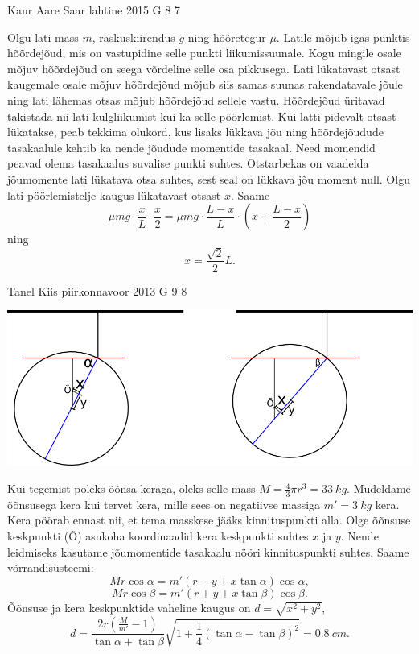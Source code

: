\documentclass[11pt]{article}
\begin{document}
{%
{Kaur Aare Saar} %
{lahtine} %
{2015} %
{G 8} %
{7} %
{

\ifSolution
Olgu lati mass $m$, raskuskiirendus $g$ ning hõõretegur $\mu$. Latile mõjub igas punktis hõõrdejõud, mis on vastupidine selle punkti liikumissuunale. Kogu mingile osale mõjuv hõõrdejõud on seega võrdeline selle osa pikkusega. Lati lükatavast otsast kaugemale osale mõjuv hõõrdejõud mõjub siis samas suunas rakendatavale jõule ning lati lähemas otsas mõjub hõõrdejõud sellele vastu. Hõõrdejõud üritavad takistada nii lati kulgliikumist kui ka selle pöörlemist. Kui latti pidevalt otsast lükatakse, peab tekkima olukord, kus lisaks lükkava jõu ning hõõrdejõudude tasakaalule kehtib ka nende jõudude momentide tasakaal. Need momendid peavad olema tasakaalus suvalise punkti suhtes. Otstarbekas on vaadelda jõumomente lati lükatava otsa suhtes, sest seal on lükkava jõu moment null. Olgu lati pöörlemistelje kaugus lükatavast otsast $x$. Saame
\[
\mu mg \cdot \frac{x}{L} \cdot \frac{x}{2}=\mu mg \cdot \frac{L-x}{L} \cdot \left(x+\frac{L-x}{2}\right)
\]
ning
\[
x=\frac{\sqrt{2}}{2}L.
\]
\fi
}

{Tanel Kiis} %
{piirkonnavoor} %
{2013} %
{G 9} %
{8} %
{

\ifSolution
\begin{center}
\includegraphics[width=\textwidth]{2013-v2g-09-kera.png}
\end{center}

Kui tegemist poleks õõnsa keraga, oleks selle mass $M=\frac{4}{3}\pi r^3 = \SI{33}{kg}$. Mudeldame õõnsusega kera kui tervet kera, mille sees on negatiivse massiga $m'=\SI{3}{kg}$ kera. Kera pöörab ennast nii, et tema masskese jääks kinnituspunkti alla. Olge õõnsuse keskpunkti (Õ) asukoha koordinaadid kera keskpunkti suhtes $x$ ja $y$. Nende leidmiseks kasutame jõumomentide tasakaalu nööri kinnituspunkti suhtes. Saame võrrandisüsteemi:
\[Mr \cos \alpha = m'(r-y+x \tan \alpha) \cos \alpha,\]
\[Mr \cos \beta = m'(r+y+x \tan \beta) \cos \beta.\]
Õõnsuse ja kera keskpunktide vaheline kaugus on $d=\sqrt{x^2+y^2}$,
\[ d=\frac{2r(\frac{M}{m'}-1)}{\tan\alpha+\tan\beta}\sqrt{1+\frac{1}{4}(\tan\alpha-\tan\beta)^2} = \SI{0,8}{cm}. \]
\fi
}

}
\end{document}
